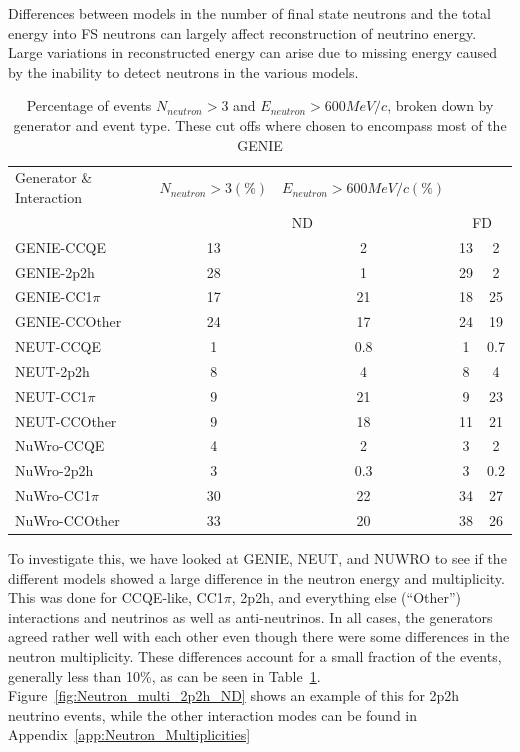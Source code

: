 \documentclass[12pt]{article}
\begin{document}
Differences between models in the number of final state neutrons and the total energy into FS neutrons can largely affect reconstruction of neutrino energy. Large variations in reconstructed energy can arise due to missing energy caused by the inability to detect neutrons in the various models.  

\begin{table}
\centering
 \begin{tabular}{| l | c  c | c c |} 
 \hline
   Generator \& Interaction& $N_{neutron}>3 (\%)$ & $E_{neutron}>600 MeV/c (\%)$\\ 
    & \multicolumn{2}{|c|}{ND} & \multicolumn{2}{|c|}{FD} \\ \hline
   GENIE-CCQE & 13 & 2 & 13 & 2\\ 
   GENIE-2p2h & 28 & 1 & 29 & 2 \\ 
   GENIE-CC1$\pi$ & 17 & 21 & 18 & 25\\ 
   GENIE-CCOther & 24 & 17 & 24 & 19\\ \hline
   NEUT-CCQE & 1 & 0.8 & 1 & 0.7 \\ 
   NEUT-2p2h & 8 & 4 & 8 & 4\\ 
   NEUT-CC1$\pi$ & 9 & 21 & 9 & 23\\ 
   NEUT-CCOther & 9 & 18 & 11 & 21\\ \hline
   NuWro-CCQE & 4 & 2 & 3 & 2 \\ 
   NuWro-2p2h & 3 & 0.3 & 3 & 0.2\\ 
   NuWro-CC1$\pi$ & 30 & 22 & 34 & 27\\ 
   NuWro-CCOther & 33 & 20 & 38 & 26 \\ \hline
\end{tabular}
\caption{Percentage of events $N_{neutron}>3$ and $E_{neutron}>600 MeV/c$, broken down by generator and event type.  These cut offs where chosen to encompass most of the GENIE }
\label{tab:int_prob}
\end{table}

To investigate this, we have looked at GENIE, NEUT, and NUWRO to see if the different models showed a large difference in the neutron energy and multiplicity.  
This was done for CCQE-like, CC1$\pi$, 2p2h, and everything else (``Other'') interactions and neutrinos as well as anti-neutrinos.  
In all cases, the generators agreed rather well with each other even though there were some differences in the neutron multiplicity. 
These differences account for a small fraction of the events, generally less than 10\%, as can be seen in Table~\ref{tab:int_prob}.
Figure~\ref{fig:Neutron_multi_2p2h_ND} shows an example of this for 2p2h neutrino events, while the other interaction modes can be found in Appendix~\ref{app:Neutron_Multiplicities}
  
\end{document}
